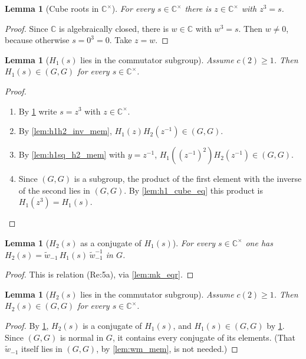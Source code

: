 \documentclass[11pt]{article}
\newtheorem{lemma}[theorem]{Lemma}
\theoremstyle{definition}
\theoremstyle{remark}
\newcommand{\C}{\mathbb{C}}
\newcommand{\Cx}{\mathbb{C}^{\times}}
\newcommand{\wt}{\widetilde{w}}
\newcommand{\comm}{(G,G)}
\begin{document}
\begin{lemma}[Cube roots in $\Cx$]\label{lem:exists_unit_cube}
For every $s\in\Cx$ there is $z\in\Cx$ with $z^3=s$.
\end{lemma}
\begin{proof}
Since $\C$ is algebraically closed, there is $w\in\C$ with $w^3=s$. Then $w\ne 0$, because otherwise $s=0^3=0$. Take $z=w$.
\end{proof}

\begin{lemma}[$H_1(s)$ lies in the commutator subgroup]\label{lem:h1_mem}
Assume $c(2)\ge1$. Then $H_1(s)\in\comm$ for every $s\in\Cx$.
\end{lemma}
\begin{proof}
\begin{enumerate}
\item By \cref{lem:exists_unit_cube} write $s=z^3$ with $z\in\Cx$.
\item By \cref{lem:h1h2_inv_mem}, $H_1(z)H_2(z^{-1})\in\comm$.
\item By \cref{lem:h1sq_h2_mem} with $y=z^{-1}$, $H_1((z^{-1})^2)H_2(z^{-1})\in\comm$.
\item Since $\comm$ is a subgroup, the product of the first element with the inverse of the second lies in $\comm$. By \cref{lem:h1_cube_eq} this product is $H_1(z^3)=H_1(s)$. \qedhere
\end{enumerate}
\end{proof}

\begin{lemma}[$H_2(s)$ as a conjugate of $H_1(s)$]\label{lem:h2_eq_conj}
For every $s\in\Cx$ one has $H_2(s)=\wt_{-1}\,H_1(s)\,\wt_{-1}^{-1}$ in $G$.
\end{lemma}
\begin{proof}
This is relation (Re:5a), via \cref{lem:mk_eqr}.
\end{proof}

\begin{lemma}[$H_2(s)$ lies in the commutator subgroup]\label{lem:h2_mem}
Assume $c(2)\ge1$. Then $H_2(s)\in\comm$ for every $s\in\Cx$.
\end{lemma}
\begin{proof}
By \cref{lem:h2_eq_conj}, $H_2(s)$ is a conjugate of $H_1(s)$, and $H_1(s)\in\comm$ by \cref{lem:h1_mem}. Since $\comm$ is normal in $G$, it contains every conjugate of its elements. (That $\wt_{-1}$ itself lies in $\comm$, by \cref{lem:wm_mem}, is not needed.)
\end{proof}
\end{document}
